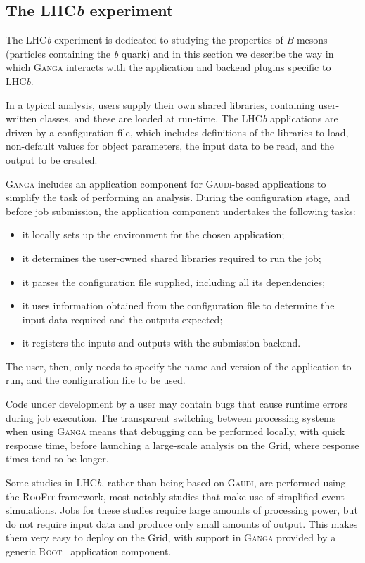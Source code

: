 \documentclass{elsart}
\def\lhcb {LHC{\em b\/}\xspace}
\def\ganga {\textsc{Ganga}\xspace}
\def\root {\textsc{Root}\xspace}
\def\gaudi {\textsc{Gaudi}\xspace}
\def\grid {Grid\xspace}
\def\roofit{\textsc{RooFit}\xspace}
\begin{document}
\subsection{The \lhcb experiment}
\label{sec:lhcb}

The \lhcb experiment is dedicated to studying the properties of \textit{B}
mesons (particles containing the \textit{b} quark) and in this section we
describe the way in which \ganga interacts with the application and
backend plugins specific to \lhcb.

In a typical analysis, users supply their own shared libraries, containing
user-written classes, and these are loaded at run-time. 
The \lhcb applications are driven by a configuration file,
which includes definitions of the libraries to load, non-default values for
object parameters, the input data to be read, and the output to be created.

\ganga includes an application component for \gaudi-based applications to simplify
the task of performing an analysis. During the configuration stage, and before
job submission, the application component undertakes the following tasks:
\begin{itemize}
\item it locally sets up the environment for the chosen application;
\item it determines the user-owned shared libraries required to
  run the job;
\item it parses the configuration file supplied, including all its dependencies;
\item it uses information obtained from the configuration file to determine
  the input data required and the outputs expected;
\item it registers the inputs and outputs with the submission backend.
\end{itemize}
The user, then, only needs to specify the name and
version of the application to run, and the configuration file to be used.

Code under development by a user may contain bugs that cause
runtime errors during job execution. The transparent switching between
processing systems when using \ganga means that debugging can be
performed locally, with quick response time, before launching a large-scale
analysis on the \grid, where response times tend to be longer.

Some studies in \lhcb, rather than being based on \gaudi, are performed using
the \roofit \cite{RooFit} framework, most notably studies that make use of
simplified event simulations.   Jobs for these studies require large amounts
of processing power, but do not require
input data and produce only small amounts of output. This makes them
very easy to deploy on the \grid, with support in \ganga provided by a
generic \root~\cite{ROOT} application component.
\end{document}
